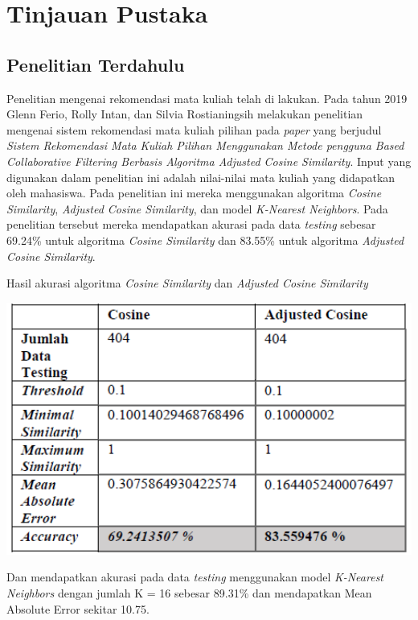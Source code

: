 \chapter{Tinjauan Pustaka}

\section{Penelitian Terdahulu}
Penelitian mengenai rekomendasi mata kuliah telah di lakukan. Pada tahun 2019 Glenn Ferio, Rolly Intan, dan Silvia Rostianingsih melakukan
penelitian mengenai sistem rekomendasi mata kuliah pilihan pada \emph{paper} yang berjudul
\emph{Sistem Rekomendasi Mata Kuliah Pilihan Menggunakan Metode pengguna Based Collaborative Filtering Berbasis Algoritma Adjusted Cosine Similarity}.
Input yang digunakan dalam penelitian ini adalah nilai-nilai mata kuliah yang didapatkan oleh mahasiswa. Pada penelitian ini mereka menggunakan algoritma
\emph{Cosine Similarity}, \emph{Adjusted Cosine Similarity}, dan model \emph{K-Nearest Neighbors}. Pada penelitian tersebut mereka mendapatkan akurasi
pada data \emph{testing} sebesar 69.24\% untuk algoritma \emph{Cosine Similarity} dan 83.55\% untuk algoritma \emph{Adjusted Cosine Similarity}.

\begin{table} [ht] \centering
  \caption{Hasil akurasi algoritma \emph{Cosine Similarity} dan \emph{Adjusted Cosine Similarity} \citep{cosineSimilarity}}
  \vspace*{2mm}
  \includegraphics[width=160mm]{gambar/akurasi-algoritma-cosine-similarity.png}
\end{table}

Dan mendapatkan akurasi pada data \emph{testing} menggunakan model \emph{K-Nearest Neighbors} dengan jumlah K = 16 sebesar 89.31\%
dan mendapatkan Mean Absolute Error sekitar 10.75.
\newpage

